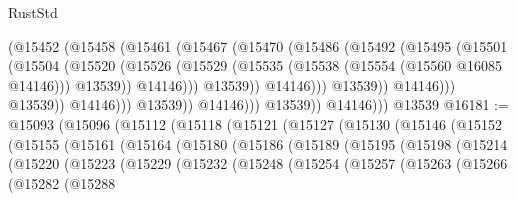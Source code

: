 \begin{lexlean}{RustStd}
\begin{coremodule}
                                    (@15452
                                      (@15458
                                        (@15461
                                          (@15467
                                            (@15470
                                              (@15486
                                                (@15492
                                                  (@15495
                                                    (@15501
                                                      (@15504
                                                        (@15520
                                                          (@15526
                                                            (@15529
                                                              (@15535
                                                                (@15538
                                                                  (@15554 (@15560 @16085 @14146)))
                                                                @13539))
                                                            @14146)))
                                                      @13539))
                                                  @14146)))
                                            @13539))
                                        @14146)))
                                  @13539))
                              @14146)))
                        @13539))
                    @14146)))
              @13539))
          @14146)))
    @13539
@16181 := @15093
    (@15096
      (@15112
        (@15118
          (@15121
            (@15127
              (@15130
                (@15146
                  (@15152
                    (@15155
                      (@15161
                        (@15164
                          (@15180
                            (@15186
                              (@15189
                                (@15195
                                  (@15198
                                    (@15214
                                      (@15220
                                        (@15223
                                          (@15229
                                            (@15232
                                              (@15248
                                                (@15254
                                                  (@15257
                                                    (@15263
                                                      (@15266
                                                        (@15282
                                                          (@15288

\end{coremodule}
\end{lexlean}

